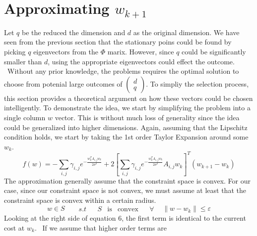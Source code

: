 \documentclass{article}
\newcommand{\tmop}[1]{\ensuremath{\operatorname{#1}}}
\begin{document}
\begin{figure}[h]
  \caption{}
\end{figure}

\begin{figure}[h]
  \caption{}
\end{figure}

\section{Approximating $w_{k + 1}$}

Let $q$ be the reduced the dimension and $d$ as the original dimension. We
have seen from the previous section that the stationary poins could be found
by picking $q$ eigenvectors from the $\Phi$ marix. However, since $q$ could be
significantly smaller than $d$, using the appropriate eigenvectors could
effect the outcome. \ Without any prior knowledge, the problems requires the
optimal solution to choose from potenial large outcomes of $\left(
\begin{array}{l}
  d\\
  q
\end{array} \right)$. To simpliy the selection process, this section provides
a theoretical argument on how these vectors could be chosen intelligently. To
demonstrate the idea, we start by simplifying the problem into a single column
$w$ vector. This is without much loss of generality since the idea could be
generalized into higher dimensions. Again, assuming that the Lipschitz
condition holds, we start by taking the 1st order Taylor Expansion around some
$w_k$.
\begin{equation}
  f (w) = - \sum_{i, j} \gamma_{i, j} e^{- \frac{w^T_k A_{i, j} w_k}{2
  \sigma^2}} + 2 \left[ \sum_{i, j} \gamma_{i, j} e^{- \frac{w^T_k A_{i, j}
  w_k}{2 \sigma^2}} A_{i, j} w_k \right]^T  (w_{k + 1} - w_k)
\end{equation}
The approximation generally assume that the constraint space is convex. For
our case, since our constraint space is not convex, we must assume at least
that the constraint space is convex within a certain radius.
\[ w \in S \begin{array}{llllllllll}
     &  & s.t &  & S & \tmop{is} & \tmop{convex} &  & \forall & 
   \end{array} \|w - w_k \| \leq \varepsilon \]
Looking at the right side of equation 6, the first term is identical to the
current cost at $w_k$. \ If we assume that higher order terms are
\end{document}
